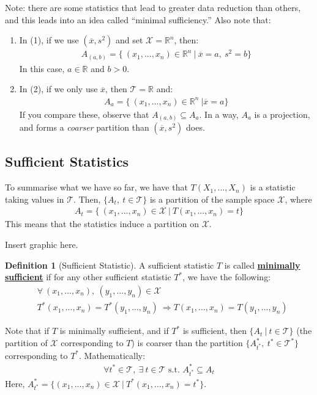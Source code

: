 \documentclass[11pt]{scrartcl}
\newcommand{\R}[0]{\mathbb{R}}
\theoremstyle{definition}
\newtheorem{definition}{Definition}
\theoremstyle{remark}
\newcommand{\dfn}[1]{\textbf{\underline{#1}}}
\newcommand{\stat}[0]{T(X_1, ..., X_n )}
\begin{document}
{Note: there are some statistics that lead to greater data reduction than others, and this leads into an idea called ``minimal sufficiency.'' Also note that: 
\begin{enumerate}[noitemsep] 
	\item In (1), if we use $(\overline{x}, s^2)$ and set $\mathcal{X} = \R^n$, then: 
	\begin{align*}
		A_{(a,b)} = \{\ (x_1, ..., x_n) \in \R^n\ |\ \overline{x} = a,\ s^2 = b \} 
	\end{align*}
	In this case, $a \in \R$ and $b > 0$. 
	\item In (2), if we only use $\overline{x}$, then $\mathcal{T} = \R$ and: 
	\begin{align*}
		A_a = \{\ (x_1, ..., x_n) \in \R^n\ | \overline{x} = a \} 
	\end{align*}
	If you compare these, observe that $A_{(a,b)} \subseteq A_a$. In a way, $A_a$ is a projection, and forms a \emph{coarser} partition than $(\overline{x}, s^2)$ does. 
\end{enumerate}

\subsection{Sufficient Statistics}
To summarise what we have so far, we have that $\stat$ is a statistic taking values in $\mathcal{T}$. Then, $\{ A_t,\ t \in \mathcal{T} \}$ is a partition of the sample space $\mathcal{X}$, where
\begin{align*}
	A_t = \{\ (x_1, ..., x_n) \in \mathcal{X}\ |\ T(x_1, ..., x_n) = t \}
\end{align*}
 This means that the statistics induce a partition on $\mathcal{X}$. 
 
 Insert graphic here. 
 
 \begin{definition}[Sufficient Statistic]
 	A sufficient statistic $T$ is called \dfn{minimally sufficient} if for any other sufficient statistic $T^*$, we have the following: 
 	\begin{align*}
 		& \forall\ (x_1, ..., x_n),\ (y_1, ..., y_n) \in \mathcal{X} \\
 		& T^*(x_1, ..., x_n) = T^*(y_1, ..., y_n)\ \Rightarrow T(x_1, ..., x_n) = T(y_1, ..., y_n)
 	\end{align*}
 \end{definition}
 Note that if $T$ is minimally sufficient, and if $T^*$ is sufficient, then $\{ A_t\ |\ t \in \mathcal{T} \}$ (the partition of $\mathcal{X}$ corresponding to $T$) is coarser than the partition $\{ A_{t^*}^*,\ t^* \in \mathcal{T}^* \}$ corresponding to $T^*$. Mathematically: 
 \begin{align*}
 	\forall t^* \in \mathcal{T},\ \exists\ t \in \mathcal{T} \text{ s.t. } A_{t^*}^* \subseteq A_t 
 \end{align*}
 Here,  $A_{t^*}^* = \{ (x_1, ..., x_n ) \in \mathcal{X}\ |\ T^*(x_1, ..., x_n) = t^* \}$. 
 
}
\end{document}
